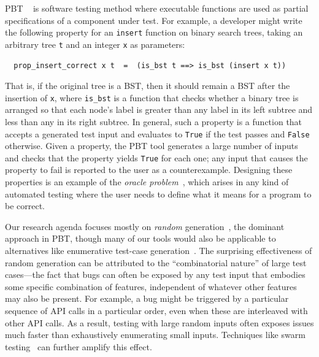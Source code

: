 %
PBT%
~\cite{hughes2007quickcheck}
is software testing method where
executable functions are used as partial
specifications of a component under test. For example, a developer might
write the following property for an \lstinline{insert}
function on binary search trees, taking an arbitrary tree \texttt{t}
and an integer
\texttt{x} as parameters:
\begin{lstlisting}
  prop_insert_correct x t  =  (is_bst t ==> is_bst (insert x t))
\end{lstlisting}
That is, if the original tree
is a BST, then it should remain
a BST after the insertion of \texttt{x},
where \lstinline{is_bst} is a function that checks whether a binary
tree is arranged so that each node's label is greater
than any label in its left subtree and less than any in its right
subtree.
In general, such a property is a function that
accepts a generated
test input
and evaluates to \lstinline{True} if the test passes and
\lstinline{False} otherwise.
Given a property, the PBT tool generates a
large number of inputs and
checks that the property yields \lstinline{True} for each one; any input
that causes the property to fail is reported to the user as a
{counterexample}.
%
Designing these properties is an example of
the {\em oracle problem}~\cite{barr_oracle_2015}, which arises in any kind of
automated testing where the user needs to define what it means for a program to
be correct.

Our research agenda focuses mostly on {\em random}
generation~\cite{hamlet1994random}, the dominant approach in PBT,
though many of our tools would also be applicable to alternatives
like enumerative test-case
generation~\cite{DBLP:conf/haskell/RuncimanNL08, leancheck}.  The
surprising effectiveness of random generation can be attributed to the
``combinatorial nature'' of large test cases---the fact that bugs can
often be exposed by any test input that embodies some specific combination
of features, independent of whatever other features may also be
present.  For example, a bug might be triggered by a particular
sequence of API calls in a particular order, even when
these are interleaved with other API calls. As a result, testing with
large random inputs often exposes issues much faster than exhaustively
enumerating small inputs.  Techniques like swarm
testing~\cite{groce2012swarm} can further amplify this effect.

